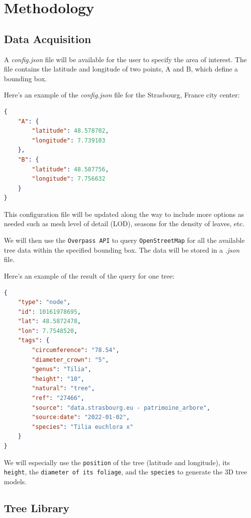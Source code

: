 \documentclass[12pt]{article}
\begin{document}
\newpage

\section{Methodology}

\subsection{Data Acquisition}
A \textit{config.json} file will be available for the user to specify the area of
interest. The file contains the latitude and longitude of two points, A and B,
which define a bounding box.

Here's an example of the \textit{config.json} file for the Strasbourg, France
city center:

\begin{lstlisting}[language=json]
{
    "A": {
        "latitude": 48.578702,
        "longitude": 7.739103
    },
    "B": {
        "latitude": 48.587756,
        "longitude": 7.756632
    }
}
\end{lstlisting}

This configuration file will be updated along the way to include more options
as needed such as mesh level of detail (LOD), seasons for the density of leaves,
etc.

We will then use the \texttt{Overpass API} to query \texttt{OpenStreetMap}
for all the available tree data within the specified bounding box.
The data will be stored in a \textit{.json} file.

\newpage
Here's an example of the result of the query for one tree:

\begin{lstlisting}[language=json]
{
    "type": "node",
    "id": 10161978695,
    "lat": 48.5872478,
    "lon": 7.7548520,
    "tags": {
        "circumference": "78.54",
        "diameter_crown": "5",
        "genus": "Tilia",
        "height": "10",
        "natural": "tree",
        "ref": "27466",
        "source": "data.strasbourg.eu - patrimoine_arbore",
        "source:date": "2022-01-02",
        "species": "Tilia euchlora x"
    }
}
\end{lstlisting}

We will especially use the \texttt{position} of the tree (latitude and longitude),
its \texttt{height}, the \texttt{diameter of its foliage}, and the \texttt{species}
to generate the 3D tree models.

\subsection{Tree Library}
\end{document}

